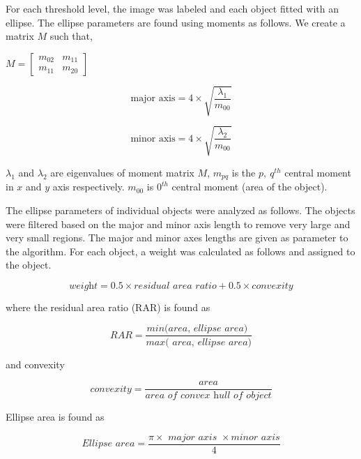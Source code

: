 \documentclass[journal]{IEEEtran}
\begin{document}
For each threshold level, the image was labeled and each object fitted with an ellipse. The ellipse parameters are found using moments \cite{burgerprinciples2009} as follows. We create a matrix $M$ such that,
 \begin{center}
 	$M = \begin{bmatrix}
 	m_{02}&m_{11} \\
 	m_{11}&m_{20}
 	\end{bmatrix}$
 \end{center} 


\begin{equation}
\text{major axis} = 4 \times \sqrt{\frac{\lambda_1}{m_{00}}}
\end{equation}

\begin{equation}
\text{minor axis} = 4 \times \sqrt{\frac{\lambda_2}{m_{00}}}
\end{equation}

$\lambda_1$ and $\lambda_2$ are eigenvalues of moment matrix $M$,  $m_{pq}$ is the $p,~q^{th}$ central moment in $x$ and $y$ axis respectively.  $m_{00}$ is $0^{th}$ central moment (area of the object). 

The ellipse parameters of individual objects were analyzed as follows. The objects were filtered based on the major and minor axis length to remove very large and very small regions. The major and minor axes lengths are given as parameter to the algorithm. For each object, a weight was calculated as follows and assigned to the object.

\begin{equation}
\textit{weight} = 0.5 \times \textit{residual area ratio} + 0.5 \times convexity 
\end{equation}

where the residual area ratio (RAR) is found as

\begin{equation}
\textit{RAR} = \frac{\textit{min(area, ellipse area) }}{\textit{max( area, ellipse area)}}  
\end{equation}

and convexity

\begin{equation}
\textit{convexity} = \frac{\textit{ area }}{\textit{area of convex hull of object}}  
\end{equation}

Ellipse area is found as

\begin{equation}
\textit{Ellipse area} = \frac{ \pi \times \textit{ major axis }\times \textit{minor axis}}{4}  
\end{equation}
\end{document}
